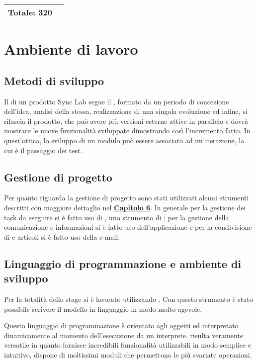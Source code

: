 \begin{center}
\begin{tabular}{|l|l|c l|}
		\hline
																	
		\multicolumn{2}{|l|}{\textbf{Totale: 320}} & \multicolumn{2}{l|}{}\\
		\hline
																												
	\end{tabular}
	\label{tableofwork}  
\end{center}
\newpage
\section{Ambiente di lavoro}
\subsection{Metodi di sviluppo}
Il  di un prodotto Sync Lab segue il , formato da un periodo di concezione dell'idea, analisi della stessa, realizzazione di una singola evoluzione ed infine, si rilascia il prodotto, che può avere più versioni esterne attive in parallelo e dovrà mostrare le nuove funzionalità sviluppate dimostrando così l'incremento fatto. In quest'ottica, lo sviluppo di un modulo può essere associato ad un iterazione, la cui  è il passaggio dei test.


\subsection{Gestione di progetto}
Per quanto riguarda la gestione di progetto sono stati utilizzati alcuni strumenti descritti con maggiore dettaglio nel \hyperlink{(chap:capitolo6)}{\textbf{Capitolo 6}}. In generale per la gestione dei task da eseguire si è fatto uso di , uno strumento di ; per la gestione della comunicazione e informazioni si è fatto uso dell'applicazione  e per la condivisione di  e articoli si è fatto uso della e-mail.
	
\subsection{Linguaggio di programmazione e ambiente di sviluppo}
Per la totalità dello stage si è lavorato utilizzando 
. Con questo strumento è stato possibile scrivere il modello in linguaggio  in modo molto agevole. 

Questo linguaggio di programmazione è orientato agli oggetti ed interpretato dinamicamente al momento dell'esecuzione da un interprete.  risulta veramente versatile in quanto fornisce incredibili funzionalità utilizzabili in modo semplice e intuitivo, dispone di moltissimi moduli che permettono le più svariate operazioni.
\newpage

